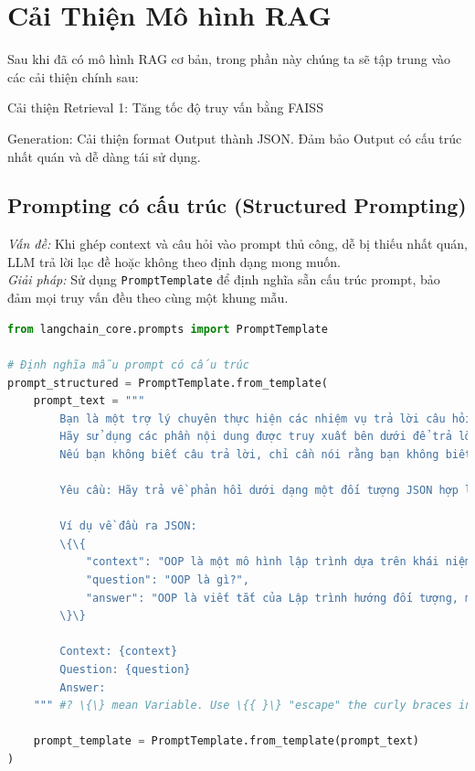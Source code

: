 \documentclass[11pt]{article}
\begin{document}
\section{Cải Thiện Mô hình RAG}
Sau khi đã có mô hình RAG cơ bản, trong phần này chúng ta sẽ tập trung vào các cải thiện chính sau:
\begin{itemizize}
\item Cải thiện Retrieval 1: Tăng tốc độ truy vấn bằng FAISS
\item Generation: Cải thiện format Output thành JSON. Đảm bảo Output có cấu trúc nhất quán và dễ dàng tái sử dụng.
\end{itemizize}

\subsection{Prompting có cấu trúc (Structured Prompting)}

\textit{Vấn đề:} Khi ghép context và câu hỏi vào prompt thủ công, dễ bị thiếu nhất quán, LLM trả lời lạc đề hoặc không theo định dạng mong muốn.\\

\noindent \textit{Giải pháp:} Sử dụng \texttt{PromptTemplate} để định nghĩa sẵn cấu trúc prompt, bảo đảm mọi truy vấn đều theo cùng một khung mẫu.\\

\begin{lstlisting}[language=Python, caption=Sử dụng PromptTemplate cho Structured Prompting]
from langchain_core.prompts import PromptTemplate

# Định nghĩa mẫu prompt có cấu trúc
prompt_structured = PromptTemplate.from_template(
    prompt_text = """
        Bạn là một trợ lý chuyên thực hiện các nhiệm vụ trả lời câu hỏi.
        Hãy sử dụng các phần nội dung được truy xuất bên dưới để trả lời câu hỏi.
        Nếu bạn không biết câu trả lời, chỉ cần nói rằng bạn không biết.

        Yêu cầu: Hãy trả về phản hồi dưới dạng một đối tượng JSON hợp lệ, với đúng ba khóa: "context", "question" và "answer". Chỉ xuất ra đối tượng JSON, không thêm bất kỳ nội dung nào khác.

        Ví dụ về đầu ra JSON:
        \{\{
            "context": "OOP là một mô hình lập trình dựa trên khái niệm đối tượng.",
            "question": "OOP là gì?",
            "answer": "OOP là viết tắt của Lập trình hướng đối tượng, một mô hình tổ chức thiết kế phần mềm xung quanh dữ liệu hoặc đối tượng, thay vì các hàm và logic."
        \}\}

        Context: {context}
        Question: {question}
        Answer:
    """ #? \{\} mean Variable. Use \{{ }\} "escape" the curly braces in your example JSON so that LangChain treats them as literal text,

    prompt_template = PromptTemplate.from_template(prompt_text)
)
\end{lstlisting}
\end{document}
